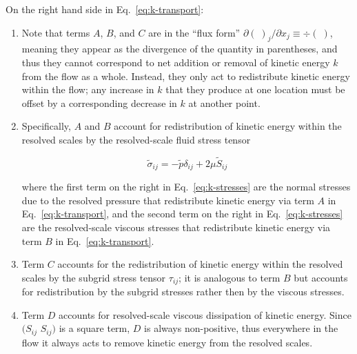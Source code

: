 On the right hand side in Eq.~\ref{eq:k-transport}:
\begin{enumerate}
    \item Note that terms $A$, $B$, and $C$ are in the ``flux form''
        $\partial(\;)_{j}/\partial x_{j} \equiv \div (\;)$, meaning they
        appear as the divergence of the quantity in parentheses, and thus
        they cannot correspond to net addition or removal of kinetic
        energy $k$ from the flow as a whole. Instead, they only act to
        redistribute kinetic energy within the flow; any increase in $k$
        that they produce at one location must be offset by a corresponding
        decrease in $k$ at another point.

    \item Specifically, $A$ and $B$ account for redistribution of kinetic
        energy within the resolved scales by the resolved-scale fluid
        stress tensor 
        
        \begin{equation}
            \widetilde{\sigma}_{ij} = - \widetilde{p} \delta_{ij} + 2 \mu \widetilde{S}_{ij}
            \label{eq:k-stresses}
        \end{equation}

        where the first term on the right in Eq.~\ref{eq:k-stresses} are the
        normal stresses due to the resolved pressure that redistribute
        kinetic energy via term $A$ in Eq.~\ref{eq:k-transport}, and the
        second term on the right in Eq.~\ref{eq:k-stresses} are the 
        resolved-scale viscous stresses that redistribute kinetic energy
        via term $B$ in Eq.~\ref{eq:k-transport}.

    \item Term $C$ accounts for the redistribution of kinetic energy within
        the resolved scales by the subgrid stress tensor $\tau_{ij}$; it is
        analogous to term $B$ but accounts for redistribution by the 
        subgrid stresses rather then by the viscous stresses.

    \item Term $D$ accounts for resolved-scale viscous dissipation of
        kinetic energy. Since $(S_{ij}$ $S_{ij})$ is a square term, $D$ is
        always non-positive, thus everywhere in the flow it always acts to
        remove kinetic energy from the resolved scales.


\end{enumerate}

